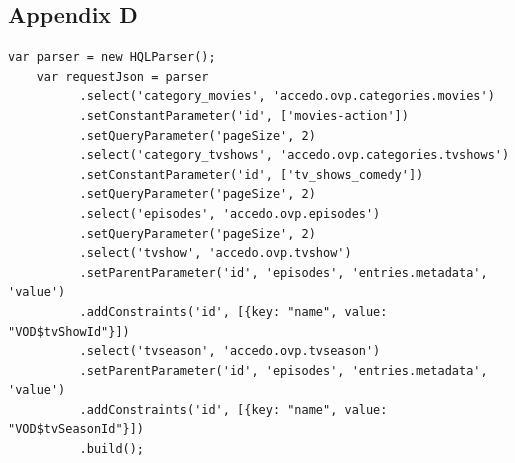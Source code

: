 \begin{appendices}
\chapter{Appendix D}

\begin{lstlisting}[frame=single,linewidth=15cm,breaklines=true,caption=HQL usage]
	var parser = new HQLParser();
	var requestJson = parser
		  .select('category_movies', 'accedo.ovp.categories.movies')
		  .setConstantParameter('id', ['movies-action'])
		  .setQueryParameter('pageSize', 2)
		  .select('category_tvshows', 'accedo.ovp.categories.tvshows')
		  .setConstantParameter('id', ['tv_shows_comedy'])
		  .setQueryParameter('pageSize', 2)
		  .select('episodes', 'accedo.ovp.episodes')
		  .setQueryParameter('pageSize', 2)
		  .select('tvshow', 'accedo.ovp.tvshow')
		  .setParentParameter('id', 'episodes', 'entries.metadata', 'value')
		  .addConstraints('id', [{key: "name", value: "VOD$tvShowId"}])
		  .select('tvseason', 'accedo.ovp.tvseason')
		  .setParentParameter('id', 'episodes', 'entries.metadata', 'value')
		  .addConstraints('id', [{key: "name", value: "VOD$tvSeasonId"}])
		  .build();

\end{lstlisting}

\end{appendices}

